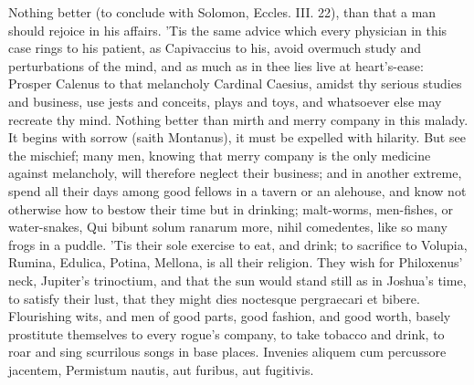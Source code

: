 {Nothing better (to conclude with Solomon, Eccles. III. 22), than that a
man should rejoice in his affairs. 'Tis the same advice which every
physician in this case rings to his patient, as Capivaccius to his,
 avoid overmuch study and perturbations of the mind, and as much
as in thee lies live at heart's-ease: Prosper Calenus to that
melancholy Cardinal Caesius, amidst thy serious studies and
business, use jests and conceits, plays and toys, and whatsoever else
may recreate thy mind. Nothing better than mirth and merry company in
this malady. It begins with sorrow (saith Montanus), it must be
expelled with hilarity.
But see the mischief; many men, knowing that merry company is the only
medicine against melancholy, will therefore neglect their business; and
in another extreme, spend all their days among good fellows in a tavern
or an alehouse, and know not otherwise how to bestow their time but in
drinking; malt-worms, men-fishes, or water-snakes, Qui bibunt
solum ranarum more, nihil comedentes, like so many frogs in a puddle.
'Tis their sole exercise to eat, and drink; to sacrifice to Volupia,
Rumina, Edulica, Potina, Mellona, is all their religion. They wish for
Philoxenus' neck, Jupiter's trinoctium, and that the sun would stand
still as in Joshua's time, to satisfy their lust, that they might dies
noctesque pergraecari et bibere. Flourishing wits, and men of good
parts, good fashion, and good worth, basely prostitute themselves to
every rogue's company, to take tobacco and drink, to roar and sing
scurrilous songs in base places.
Invenies aliquem cum percussore jacentem,
Permistum nautis, aut furibus, aut fugitivis.

}
